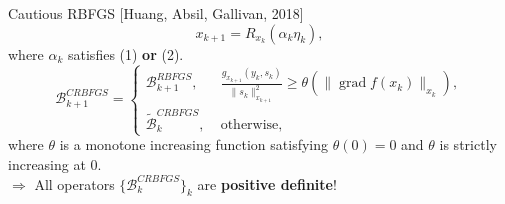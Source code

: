 \documentclass[9.4pt]{beamer}
\begin{document}
\begin{frame}{Cautious RBFGS}
    \vspace{-1\baselineskip}\hfill{\tiny{[Huang, Absil, Gallivan, 2018]}}\\
    \begin{equation*}
        x_{k+1} = R_{x_k}(\alpha_k \eta_k),
    \end{equation*}
    where $\alpha_k$ satisfies (1) \textbf{or} (2). \\[.5\baselineskip]
    \begin{equation*}
        \mathcal{B}^{CRBFGS}_{k+1} = \begin{cases} \mathcal{B}^{RBFGS}_{k+1}, & \; \frac{g_{x_{k+1}}(y_k,s_k)}{\lVert s_k \rVert^{2}_{x_{k+1}}} \geq \theta(\lVert \operatorname{grad} f(x_k) \rVert_{x_k}), \\ \widetilde{\mathcal{B}}^{CRBFGS}_k, & \; \text{otherwise}, \end{cases}
    \end{equation*}
    where $\theta$ is a monotone increasing function satisfying $\theta(0) = 0$ and $\theta$ is strictly increasing at $0$. \\[.5\baselineskip]
    $\Rightarrow$ All operators $\{\mathcal{B}^{CRBFGS}_k\}_k$ are \textbf{positive definite}!
\end{frame}
\end{document}
